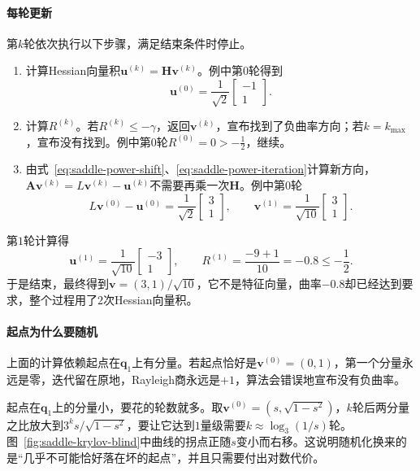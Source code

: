 \paragraph{每轮更新}
第$k$轮依次执行以下步骤，满足结束条件时停止。

\begin{enumerate}
 \item 计算Hessian向量积$\bm{u}^{(k)}=\bm{H}\bm{v}^{(k)}$。例中第$0$轮得到
 \[
  \bm{u}^{(0)}=\frac{1}{\sqrt2}\begin{bmatrix}-1\\1\end{bmatrix}.
 \]
 \item 计算$R^{(k)}$。若$R^{(k)}\leq-\gamma$，返回$\bm{v}^{(k)}$，宣布找到了负曲率方向；若$k=k_{\max}$，宣布没有找到。例中第$0$轮$R^{(0)}=0>-\tfrac12$，继续。
 \item 由式~\eqref{eq:saddle-power-shift}、\eqref{eq:saddle-power-iteration}计算新方向，$\bm{A}\bm{v}^{(k)}=L\bm{v}^{(k)}-\bm{u}^{(k)}$不需要再乘一次$\bm{H}$。例中第$0$轮
 \[
  L\bm{v}^{(0)}-\bm{u}^{(0)}=\frac{1}{\sqrt2}\begin{bmatrix}3\\1\end{bmatrix},\qquad
  \bm{v}^{(1)}=\frac{1}{\sqrt{10}}\begin{bmatrix}3\\1\end{bmatrix}.
 \]
\end{enumerate}

第$1$轮计算得
\[
 \bm{u}^{(1)}=\frac{1}{\sqrt{10}}\begin{bmatrix}-3\\1\end{bmatrix},\qquad
 R^{(1)}=\frac{-9+1}{10}=-0.8\leq-\frac12.
\]
于是结束，最终得到$\bm{v}=(3,1)/\sqrt{10}$，它不是特征向量，曲率$-0.8$却已经达到要求，整个过程用了$2$次Hessian向量积。

\paragraph{起点为什么要随机}
上面的计算依赖起点在$\bm{q}_1$上有分量。若起点恰好是$\bm{v}^{(0)}=(0,1)$，第一个分量永远是零，迭代留在原地，Rayleigh商永远是$+1$，算法会错误地宣布没有负曲率。

起点在$\bm{q}_1$上的分量小，要花的轮数就多。取$\bm{v}^{(0)}=(s,\sqrt{1-s^2})$，$k$轮后两分量之比放大到$3^ks/\sqrt{1-s^2}$，要让它达到$1$量级需要$k\approx\log_3(1/s)$轮。图~\ref{fig:saddle-krylov-blind}中曲线的拐点正随$s$变小而右移。这说明随机化换来的是“几乎不可能恰好落在坏的起点”，并且只需要付出对数代价。

